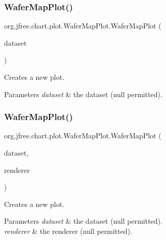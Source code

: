 \subsubsection{\texorpdfstring{Wafer\+Map\+Plot()}{WaferMapPlot()}\hspace{0.1cm}{\footnotesize\ttfamily [2/3]}}
{\footnotesize\ttfamily org.\+jfree.\+chart.\+plot.\+Wafer\+Map\+Plot.\+Wafer\+Map\+Plot (\begin{DoxyParamCaption}\item[{\mbox{\hyperlink{classorg_1_1jfree_1_1data_1_1general_1_1_wafer_map_dataset}{Wafer\+Map\+Dataset}}}]{dataset }\end{DoxyParamCaption})}

Creates a new plot.


\begin{DoxyParams}{Parameters}
{\em dataset} & the dataset ({\ttfamily null} permitted). \\
\hline
\end{DoxyParams}
\mbox{\label{classorg_1_1jfree_1_1chart_1_1plot_1_1_wafer_map_plot_a37f1c9d71b4fe70b48dd58b5bb5a5840}} 
\subsubsection{\texorpdfstring{Wafer\+Map\+Plot()}{WaferMapPlot()}\hspace{0.1cm}{\footnotesize\ttfamily [3/3]}}
{\footnotesize\ttfamily org.\+jfree.\+chart.\+plot.\+Wafer\+Map\+Plot.\+Wafer\+Map\+Plot (\begin{DoxyParamCaption}\item[{\mbox{\hyperlink{classorg_1_1jfree_1_1data_1_1general_1_1_wafer_map_dataset}{Wafer\+Map\+Dataset}}}]{dataset,  }\item[{\mbox{\hyperlink{classorg_1_1jfree_1_1chart_1_1renderer_1_1_wafer_map_renderer}{Wafer\+Map\+Renderer}}}]{renderer }\end{DoxyParamCaption})}

Creates a new plot.


\begin{DoxyParams}{Parameters}
{\em dataset} & the dataset ({\ttfamily null} permitted). \\
\hline
{\em renderer} & the renderer ({\ttfamily null} permitted). \\
\hline
\end{DoxyParams}


